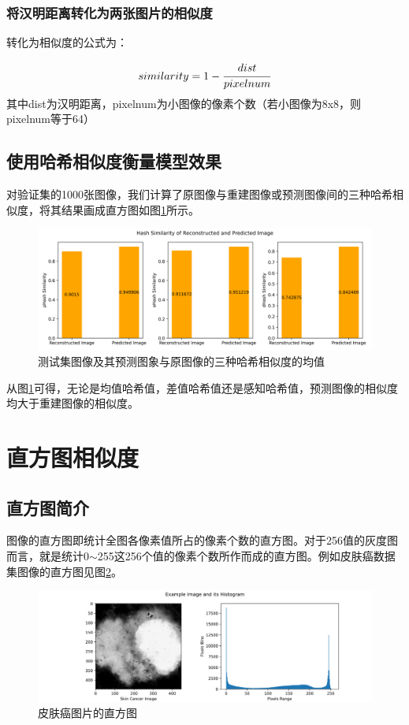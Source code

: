 \subsubsection{将汉明距离转化为两张图片的相似度}
转化为相似度的公式为：

\begin{equation}\label{610}
similarity = 1 - \cfrac{dist}{pixelnum}
\end{equation}
其中dist为汉明距离，pixelnum为小图像的像素个数（若小图像为8x8，则pixelnum等于64）

\subsection{使用哈希相似度衡量模型效果}
对验证集的1000张图像，我们计算了原图像与重建图像或预测图像间的三种哈希相似度，将其结果画成直方图如图\ref{fig608}所示。

\begin{figure}[h]
	\centering
	\includegraphics[width=0.9\columnwidth]{image/chap06/img608.png}
	\caption{测试集图像及其预测图象与原图像的三种哈希相似度的均值}
	\label{fig608}
\end{figure}

从图\ref{fig608}可得，无论是均值哈希值，差值哈希值还是感知哈希值，预测图像的相似度均大于重建图像的相似度。

\section{直方图相似度}
\subsection{直方图简介}
图像的直方图即统计全图各像素值所占的像素个数的直方图。对于256值的灰度图而言，就是统计0$ \sim $255这256个值的像素个数所作而成的直方图。例如皮肤癌数据集图像的直方图见图\ref{fig609}。

\begin{figure}[h]
	\centering
	\includegraphics[width=0.9\columnwidth]{image/chap06/img609.png}
	\caption{皮肤癌图片的直方图}
	\label{fig609}
\end{figure}

